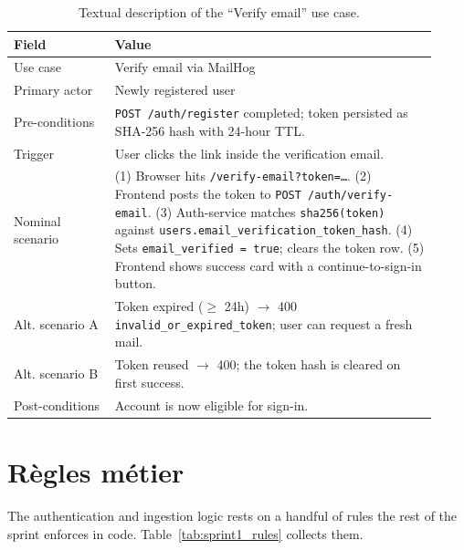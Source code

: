 \documentclass[12pt, a4paper, oneside]{report}
\begin{document}
\begin{table}[H]
\centering
\caption{Textual description of the ``Verify email'' use case.}
\label{tab:uc_verify}
\begin{tabular}{|p{0.22\linewidth}|L{0.7\linewidth}|}
\hline
\textbf{Field} & \textbf{Value} \\
\hline
Use case & Verify email via MailHog \\ \hline
Primary actor & Newly registered user \\ \hline
Pre-conditions & \texttt{POST /auth/register} completed; token persisted as SHA-256 hash with 24-hour TTL. \\ \hline
Trigger & User clicks the link inside the verification email. \\ \hline
Nominal scenario & (1) Browser hits \texttt{/verify-email?token=…}.
(2) Frontend posts the token to \texttt{POST /auth/verify-email}.
(3) Auth-service matches \texttt{sha256(token)} against \texttt{users.email\_verification\_token\_hash}.
(4) Sets \texttt{email\_verified = true}; clears the token row.
(5) Frontend shows success card with a continue-to-sign-in button. \\ \hline
Alt. scenario A & Token expired ($\geq$ 24h) $\to$ 400 \texttt{invalid\_or\_expired\_token}; user can request a fresh mail. \\ \hline
Alt. scenario B & Token reused $\to$ 400; the token hash is cleared on first success. \\ \hline
Post-conditions & Account is now eligible for sign-in. \\
\hline
\end{tabular}
\end{table}

\section{Règles métier}

The authentication and ingestion logic rests on a handful of rules
the rest of the sprint enforces in code. Table~\ref{tab:sprint1_rules}
collects them.
\end{document}
